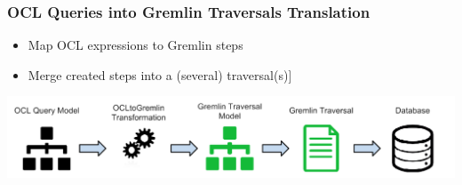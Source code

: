 \documentclass[10pt]{beamer}
\begin{document}
\begin{frame}[c]\frametitle{OCL Queries into Gremlin Traversals Translation}
	\begin{itemize}
		\item Map OCL expressions to Gremlin steps
		\item Merge created steps into a (several) traversal(s)]
	\end{itemize}
    \begin{center}
      \includegraphics[width=\textwidth]{mogwai-architecture.png}
    \end{center}	
\end{frame}
\end{document}
